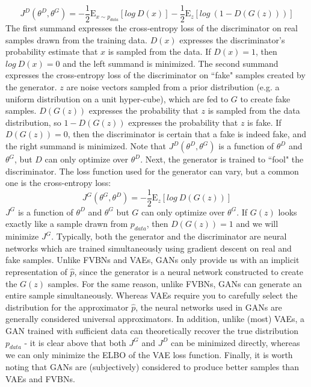 \documentclass[a4paper]{article}
\begin{document}
\begin{enumerate}
{$$ J^D(\theta^D, \theta^G) = -\frac{1}{2} \mathrm{E}_{x \sim p_{data}} [log\ D(x)] - \frac{1}{2} \mathrm{E}_z [log\ (1 - D(G(z)))]$$
The first summand expresses the cross-entropy loss of the discriminator on real samples drawn from the training data. $D(x)$ expresses the discriminator's probability estimate that $x$ is sampled from the data. If $D(x) = 1$, then $log\ D(x) = 0$ and the left summand is minimized. The second summand expresses the cross-entropy loss of the discriminator on ``fake" samples created by the generator. $z$ are noise vectors sampled from a prior distribution (e.g. a uniform distribution on a unit hyper-cube), which are fed to $G$ to create fake samples. $D(G(z))$ expresses the probability that $z$ is sampled from the data distribution, so $1- D(G(z))$ expresses the probability that $z$ is fake. If $D(G(z)) = 0$, then the discriminator is certain that a fake is indeed fake, and the right summand is minimized. Note that $ J^D(\theta^D, \theta^G)$ is a function of $\theta^D$ and $\theta^G$, but $D$ can only optimize over $\theta^D$.
\newline
\newline
Next, the generator is trained to ``fool" the discriminator. The loss function used for the generator can vary, but a common one is the cross-entropy loss:
$$J^G(\theta^G, \theta^D) = -\frac{1}{2} \mathrm{E}_z [log \ D(G(z))] $$
$J^G$ is a function of $\theta^D$ and $\theta^G$ but $G$ can only optimize over $\theta^G$. If $G(z)$ looks exactly like a sample drawn from $p_{data}$, then $D(G(z)) = 1$ and we will minimize $J^G$.
\newline
\newline
Typically, both the generator and the discriminator are neural networks which are trained simultaneously using gradient descent on real and fake samples. Unlike FVBNs and VAEs, GANs only provide us with an implicit representation of $\hat{p}$, since the generator is a neural network constructed to create the $G(z)$ samples. For the same reason, unlike FVBNs, GANs can generate an entire sample simultaneously. Whereas VAEs require you to carefully select the distribution for the approximator $\hat{p}$, the neural networks used in GANs are generally considered universal approximators. In addition, unlike (most) VAEs, a GAN trained with sufficient data can theoretically recover the true distribution $p_{data}$ - it is clear above that both $J^G$ and $J^D$ can be minimized directly, whereas we can only minimize the ELBO of the VAE loss function. Finally, it is worth noting that GANs are (subjectively) considered to produce better samples than VAEs and FVBNs.

}
\end{enumerate}
\end{document}
